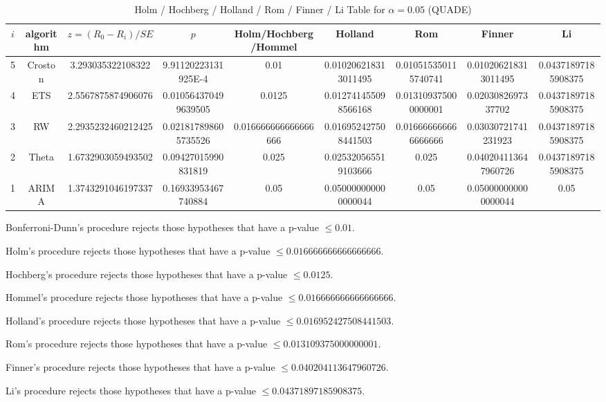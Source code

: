\documentclass[a4paper,10pt]{article}
\begin{document}
\begin{landscape}
\begin{table}[!htp]
\centering\scriptsize
\caption{Holm / Hochberg / Holland / Rom / Finner / Li Table for $\alpha=0.05$ (QUADE)}
\begin{tabular}{ccccccccc}
$i$&algorithm&$z=(R_0 - R_i)/SE$&$p$&Holm/Hochberg/Hommel&Holland&Rom&Finner&Li\\
\hline
5&Croston&3.293035322108322&9.91120223131925E-4&0.01&0.010206218313011495&0.010515350115740741&0.010206218313011495&0.04371897185908375\\
4&ETS&2.5567875874906076&0.010564370499639505&0.0125&0.012741455098566168&0.013109375000000001&0.0203082697337702&0.04371897185908375\\
3&RW&2.2935232460212425&0.021817898605735526&0.016666666666666666&0.016952427508441503&0.016666666666666666&0.03030721741231923&0.04371897185908375\\
2&Theta&1.6732903059493502&0.09427015990831819&0.025&0.025320565519103666&0.025&0.040204113647960726&0.04371897185908375\\
1&ARIMA&1.3743291046197337&0.16933953467740884&0.05&0.050000000000000044&0.05&0.050000000000000044&0.05\\
\hline
\end{tabular}
\end{table}
Bonferroni-Dunn's procedure rejects those hypotheses that have a p-value $\le0.01$.


Holm's procedure rejects those hypotheses that have a p-value $\le0.016666666666666666$.


Hochberg's procedure rejects those hypotheses that have a p-value $\le0.0125$.


Hommel's procedure rejects those hypotheses that have a p-value $\le0.016666666666666666$.


Holland's procedure rejects those hypotheses that have a p-value $\le0.016952427508441503$.


Rom's procedure rejects those hypotheses that have a p-value $\le0.013109375000000001$.


Finner's procedure rejects those hypotheses that have a p-value $\le0.040204113647960726$.


Li's procedure rejects those hypotheses that have a p-value $\le0.04371897185908375$.



\newpage


\end{landscape}
\end{document}
